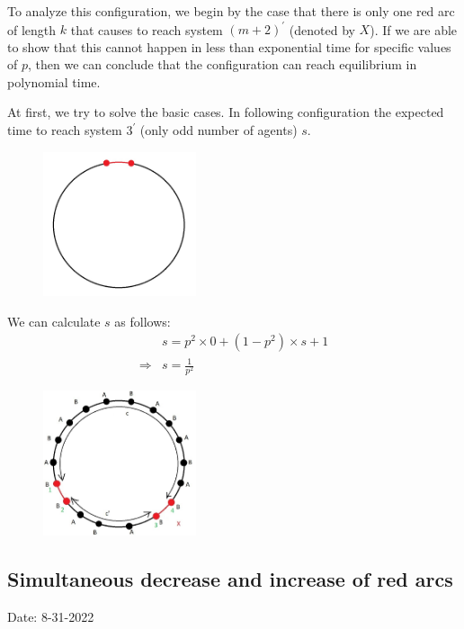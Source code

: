 \documentclass[]{book}
\theoremstyle{definition}
\begin{document}
To analyze this configuration, we begin by the case that there is only one red arc of length $k$ that causes to reach system $(m+2)^\prime$ (denoted by $X$). If we are able to show that this cannot happen in less than exponential time for specific values of $p$, then we can conclude that the configuration can reach equilibrium in polynomial time.

At first, we try to solve the basic cases. In following configuration the expected time to reach system $3^\prime$ (only odd number of agents) $s$. 
\begin{figure}[H]
    \centering
    \includegraphics[width=0.4\textwidth]{figures/sync_pure_increase_1.jpg}
    \caption{}
\end{figure}
We can calculate $s$ as follows:
\begin{equation}
\begin{split}
    &s = p^2 \times 0 + \left( 1 - p^2 \right)\times s + 1 \\
    \Rightarrow &s = \frac{1}{p^2}
\end{split}
\end{equation}

\begin{figure}[H]
    \centering
    \includegraphics[width=0.4\textwidth]{figures/sync_pure_increase_2.jpg}
    \caption{}
\end{figure}

\subsection{Simultaneous decrease and increase of red arcs}
\newpage
\begin{center}
Date: 8-31-2022
\end{center}
\end{document}
